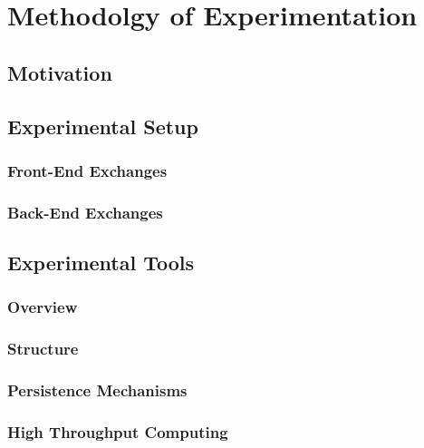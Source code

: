 \chapter{Methodolgy of Experimentation}\label{ch:method}

\section{Motivation}

\section{Experimental Setup}

\subsection{Front-End Exchanges}

\subsection{Back-End Exchanges}

\section{Experimental Tools}

\subsection{Overview}

\subsection{Structure}

\subsection{Persistence Mechanisms}

\subsection{High Throughput Computing}
